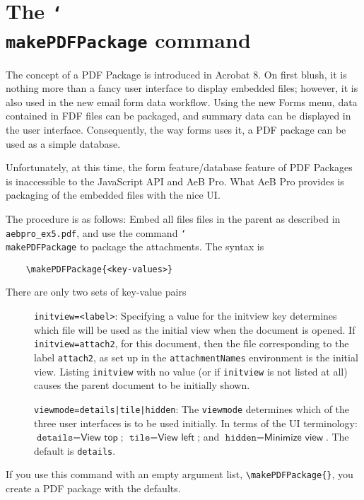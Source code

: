 \documentclass{article}
\newcommand{\cs}[1]{\texttt{\char`\\#1}}
\newcommand\newtopic{\par\ifdim\lastskip>0pt\relax\vskip-\lastskip\fi
\par\vskip6pt\noindent}
\begin{document}
\maketitle

\section*{The \protect\cs{makePDFPackage} command}


The concept of a PDF Package is introduced in Acrobat 8. On first
blush, it is nothing more than a fancy user interface to display
embedded files;  however, it is also used in the new email form data
workflow. Using the new \textsf{Forms} menu, data contained in FDF
files can be packaged, and summary data can be displayed in the user
interface. Consequently, the way forms uses it, a PDF package can be
used as a simple database.

Unfortunately, at this time, the form feature/database feature of
PDF Packages is inaccessible to the JavaScript API and AeB Pro.
What AeB Pro provides is packaging of the embedded files with the
nice UI.

\newtopic The procedure is as follows: Embed all files files in the
parent as described in \texttt{aebpro\_ex5.pdf}, and use the command
\cs{makePDFPackage} to package the attachments. The syntax is
\begin{verbatim}
    \makePDFPackage{<key-values>}
\end{verbatim}
There are only two sets of key-value pairs
\begin{description}
    \item[]\texttt{initview=<label>}: Specifying a value for the
    initview key determines which file will be used as the initial
    view when the document is opened. If \texttt{initview=attach2},
    for this document, then the file corresponding to the label
    \texttt{attach2}, as set up in the \texttt{attachmentNames}
    environment is the initial view. Listing \texttt{initview} with
    no value (or if \texttt{initview} is not listed at all) causes
    the parent document to be initially shown.

    \item[]\texttt{viewmode=details|tile|hidden}: The
    \texttt{viewmode} determines which of the three user interfaces
    is to be used initially. In terms of the UI terminology:
    $\texttt{details} = \textsf{View top}$; $\texttt{tile} =
    \textsf{View left}$; and $\texttt{hidden} = \textsf{Minimize
    view}$. The default is \texttt{details}.
\end{description}
If you use this command with an empty argument list,
\verb!\makePDFPackage{}!, you create a PDF package with the
defaults.
\end{document}
